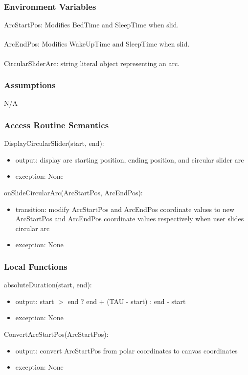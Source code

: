 \documentclass[12pt, titlepage]{article}
\begin{document}
\subsubsection{Environment Variables}
ArcStartPos: Modifies BedTime and SleepTime when slid.\\\\
ArcEndPos: Modifies WakeUpTime and SleepTime when slid.\\\\
CircularSliderArc: string literal object representing an arc.

\subsubsection{Assumptions}
N/A

\subsubsection{Access Routine Semantics}

\noindent DisplayCircularSlider(start, end):
\begin{itemize}
	\item output: display arc starting position, ending position, and circular slider arc
	\item exception: None
\end{itemize}

\noindent onSlideCircularArc(ArcStartPos, ArcEndPos):
\begin{itemize}
	\item transition: modify ArcStartPos and ArcEndPos coordinate values to new ArcStartPos and ArcEndPos coordinate values respectively when user slides circular arc
	\item exception: None
\end{itemize}

\subsubsection{Local Functions}

\noindent absoluteDuration(start, end):
\begin{itemize}
	\item output: start $>$ end ? end + (TAU - start) : end - start  
	\item exception: None 
\end{itemize}

\noindent ConvertArcStartPos(ArcStartPos):
\begin{itemize}
	\item output: convert ArcStartPos from polar coordinates to canvas coordinates 
	\item exception: None 
\end{itemize}
\end{document}
